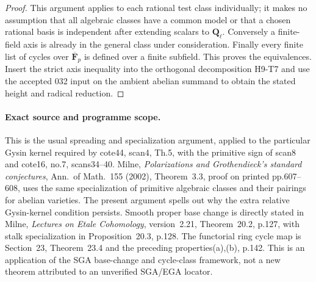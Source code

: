 \begin{proof}
This argument applies to each rational test class individually;
it makes no assumption that all algebraic classes have a
common model or that a chosen rational basis is independent
after extending scalars to $\mathbf Q_\ell$. Conversely a
finite-field axis is already in the general class under
consideration. Finally every finite list of cycles over
$\overline{\mathbf F}_p$ is defined over a finite subfield.
This proves the equivalences. Insert the strict axis
inequality into the orthogonal decomposition H9-T7 and use the accepted 032 input
on the ambient abelian summand to obtain the stated height
and radical reduction.
\end{proof}

\paragraph{Exact source and programme scope.}
This is the usual spreading and specialization argument,
applied to the particular Gysin kernel required by cote44,
scan4, Th.5, with the primitive sign of scan8 and cote16,
no.7, scans34--40. Milne, \emph{Polarizations and
Grothendieck's standard conjectures}, Ann.\ of Math.\ 155
(2002), Theorem~3.3, proof on printed pp.607--608, uses the
same specialization of primitive algebraic classes and their
pairings for abelian varieties. The present argument spells
out why the extra relative Gysin-kernel condition persists.
Smooth proper base change is directly stated in Milne,
\emph{Lectures on Etale Cohomology}, version~2.21,
Theorem~20.2, p.127, with stalk specialization in
Proposition~20.3, p.128. The functorial ring cycle map is
Section~23, Theorem~23.4 and the preceding properties(a),(b),
p.142. This is an application of the SGA base-change and
cycle-class framework, not a new theorem attributed to an
unverified SGA/EGA locator.
